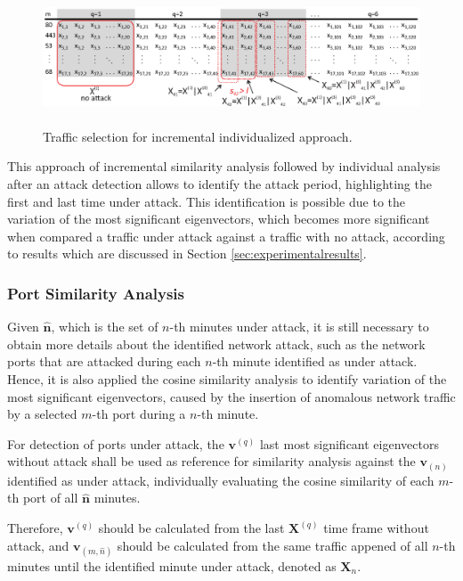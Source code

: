 \documentclass[review]{elsarticle}
\begin{document}
\begin{figure}[h!]
     \includegraphics[height=4cm, width=12.4cm]{results/figures/incremental_individualized.eps}
     \caption{Traffic selection for incremental individualized approach.}
     \label{fig:fig2}
\end{figure}

This approach of incremental similarity analysis followed by individual analysis after an attack detection allows to identify the attack period, highlighting the first and last time under attack. This identification is possible due to the variation of the most significant eigenvectors, which becomes more significant when compared a traffic under attack against a traffic with no attack, according to results which are discussed in Section \ref{sec:experimentalresults}.

\subsubsection{Port Similarity Analysis}
\label{sec:prop_PortSimilarityAnalysis}

Given $\boldsymbol{\hat{n}}$, which is the set of $n$-th minutes under attack, it is still necessary to obtain more details about the identified network attack, such as the network ports that are attacked during each $n$-th minute identified as under attack. Hence, it is also applied the cosine similarity analysis to identify variation of the most significant eigenvectors, caused by the insertion of anomalous network traffic by a selected $m$-th port during a $n$-th minute. 

For detection of ports under attack, the $\boldsymbol{v}^{(q)}$ last most significant eigenvectors without attack shall be used as reference for similarity analysis against the $\boldsymbol{v}_{(n)}$ identified as under attack, individually evaluating the cosine similarity of each $m$-th port of all $\boldsymbol{\hat{n}}$ minutes.

Therefore, $\boldsymbol{v}^{(q)}$ should be calculated from the last $\boldsymbol{X}^{(q)}$ time frame without attack, and $\boldsymbol{v}_{(m,\hat{n})}$ should be calculated from the same traffic appened of all $n$-th minutes until the identified minute under attack, denoted as $\boldsymbol{X}_n$. 
\end{document}
